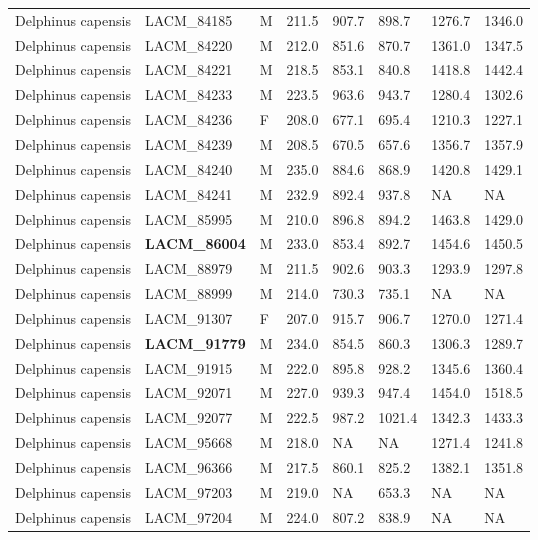 \begin{longtable}{|p{1.95in}p{1.1in}p{.15in}p{.4in}p{.4in}p{.4in}p{.4in}p{.4in}|}
  Delphinus capensis & LACM\_84185 & M & 211.5 & 907.7 & 898.7 & 1276.7 & 1346.0 \\ 
  Delphinus capensis & LACM\_84220 & M & 212.0 & 851.6 & 870.7 & 1361.0 & 1347.5 \\ 
  Delphinus capensis & LACM\_84221 & M & 218.5 & 853.1 & 840.8 & 1418.8 & 1442.4 \\ 
  Delphinus capensis & LACM\_84233 & M & 223.5 & 963.6 & 943.7 & 1280.4 & 1302.6 \\ 
  Delphinus capensis & LACM\_84236 & F & 208.0 & 677.1 & 695.4 & 1210.3 & 1227.1 \\ 
  Delphinus capensis & LACM\_84239 & M & 208.5 & 670.5 & 657.6 & 1356.7 & 1357.9 \\ 
  Delphinus capensis & LACM\_84240 & M & 235.0 & 884.6 & 868.9 & 1420.8 & 1429.1 \\ 
  Delphinus capensis & LACM\_84241 & M & 232.9 & 892.4 & 937.8 & NA & NA  \\ 
  Delphinus capensis & LACM\_85995 & M & 210.0 & 896.8 & 894.2 & 1463.8 & 1429.0 \\ 
  Delphinus capensis & \textbf{ LACM\_86004 } & M & 233.0 & 853.4 & 892.7 & 1454.6 & 1450.5 \\ 
  Delphinus capensis & LACM\_88979 & M & 211.5 & 902.6 & 903.3 & 1293.9 & 1297.8 \\ 
  Delphinus capensis & LACM\_88999 & M & 214.0 & 730.3 & 735.1 & NA & NA  \\ 
  Delphinus capensis & LACM\_91307 & F & 207.0 & 915.7 & 906.7 & 1270.0 & 1271.4 \\ 
  Delphinus capensis & \textbf{ LACM\_91779 } & M & 234.0 & 854.5 & 860.3 & 1306.3 & 1289.7 \\ 
  Delphinus capensis & LACM\_91915 & M & 222.0 & 895.8 & 928.2 & 1345.6 & 1360.4 \\ 
  Delphinus capensis & LACM\_92071 & M & 227.0 & 939.3 & 947.4 & 1454.0 & 1518.5 \\ 
  Delphinus capensis & LACM\_92077 & M & 222.5 & 987.2 & 1021.4 & 1342.3 & 1433.3 \\ 
  Delphinus capensis & LACM\_95668 & M & 218.0 & NA & NA & 1271.4 & 1241.8 \\ 
  Delphinus capensis & LACM\_96366 & M & 217.5 & 860.1 & 825.2 & 1382.1 & 1351.8 \\ 
  Delphinus capensis & LACM\_97203 & M & 219.0 & NA & 653.3 & NA & NA  \\ 
  Delphinus capensis & LACM\_97204 & M & 224.0 & 807.2 & 838.9 & NA & NA  \\ 

\end{longtable}
